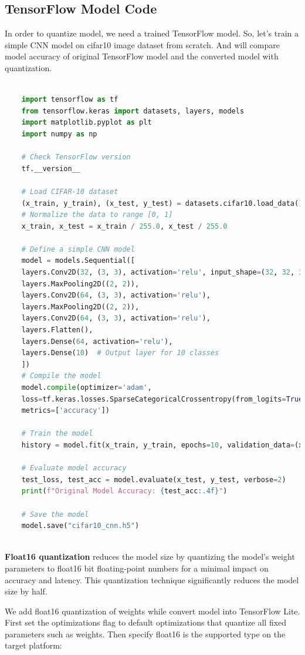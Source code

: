 \subsection{TensorFlow Model Code}
In order to quantize model, we need a trained TensorFlow model. So, let’s train a simple CNN model on cifar10 image dataset from scratch. And will compare model accuracy of original TensorFlow model and the converted model with quantization.\cite{tensorflowlite:2025}
\begin{lstlisting}[language=Python, caption=TensorFlow CNN Model for CIFAR-10,style=pythonstyle, label={lst:quantization} ]
	
	import tensorflow as tf
	from tensorflow.keras import datasets, layers, models
	import matplotlib.pyplot as plt
	import numpy as np
	
	# Check TensorFlow version
	tf.__version__
	
	# Load CIFAR-10 dataset
	(x_train, y_train), (x_test, y_test) = datasets.cifar10.load_data()
	# Normalize the data to range [0, 1]
	x_train, x_test = x_train / 255.0, x_test / 255.0
	
	# Define a simple CNN model
	model = models.Sequential([
	layers.Conv2D(32, (3, 3), activation='relu', input_shape=(32, 32, 3)),
	layers.MaxPooling2D((2, 2)),
	layers.Conv2D(64, (3, 3), activation='relu'),
	layers.MaxPooling2D((2, 2)),
	layers.Conv2D(64, (3, 3), activation='relu'),
	layers.Flatten(),
	layers.Dense(64, activation='relu'),
	layers.Dense(10)  # Output layer for 10 classes
	])
	# Compile the model
	model.compile(optimizer='adam',
	loss=tf.keras.losses.SparseCategoricalCrossentropy(from_logits=True),
	metrics=['accuracy'])
	
	# Train the model
	history = model.fit(x_train, y_train, epochs=10, validation_data=(x_test, y_test))
	
	# Evaluate model accuracy
	test_loss, test_acc = model.evaluate(x_test, y_test, verbose=2)
	print(f"Original Model Accuracy: {test_acc:.4f}")
	
	# Save the model
	model.save("cifar10_cnn.h5")
	
	\end{lstlisting}

\textbf{Float16 quantization} reduces the model size by quantizing the model’s weight parameters to float16 bit floating-point numbers for a minimal impact on accuracy and latency. This quantization technique significantly reduces the model size by half.\cite{tensorflowlite:2025}

We add float16 quantization of weights while convert model into TensorFlow Lite. First set the optimizations flag to default optimizations that quantize all fixed parameters such as weights. Then specify float16 is the supported type on the target platform:

